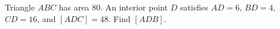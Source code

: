 Triangle $ABC$ has area $80$. An interior point $D$ satisfies $AD=6$, $BD=4$, $CD=16$, and $[ADC]=48$. Find $[ADB]$.
